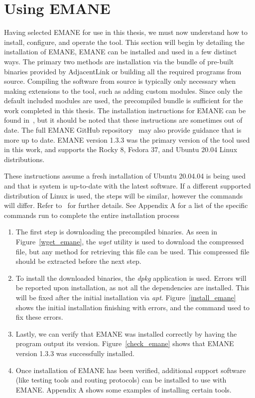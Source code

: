 \section{Using EMANE}
Having selected EMANE for use in this thesis, we must now understand how to install, configure, and operate the tool.
This section will begin by detailing the installation of EMANE, 
EMANE can be installed and used in a few distinct ways.
The primary two methods are installation via the bundle of pre-built binaries provided by AdjacentLink or building all the required programs from source.
Compiling the software from source is typically only necessary when making extensions to the tool, such as adding custom modules.
Since only the default included modules are used, the precompiled bundle is sufficient for the work completed in this thesis.
The installation instructions for EMANE can be found in~\cite{emane_tutorial}, but it should be noted that these instructions are sometimes out of date.
The full EMANE GitHub repository~\cite{emane_git} may also provide guidance that is more up to date.
EMANE version 1.3.3 was the primary version of the tool used in this work, and supports the Rocky 8, Fedora 37, and Ubuntu 20.04 Linux distributions.\par
These instructions assume a fresh installation of Ubuntu 20.04.04 is being used and that is system is up-to-date with the latest software.
If a different supported distribution of Linux is used, the steps will be similar, however the commands will differ. Refer to~\cite{emane_tutorial,emane_git} for further details.
See Appendix A for a list of the specific commands run to complete the entire installation process %
\begin{enumerate}
    \item The first step is downloading the precompiled binaries. As seen in Figure~\ref{wget_emane}, the \textit{wget} utility is used to download the compressed file, but any method for retrieving this file can be used. This compressed file should be extracted before the next step.
    \item To install the downloaded binaries, the \textit{dpkg} application is used. Errors will be reported upon installation, as not all the dependencies are installed. This will be fixed after the initial installation via \textit{apt}. Figure~\ref{install_emane} shows the initial installation finishing with errors, and the command used to fix these errors.
    \item Lastly, we can verify that EMANE was installed correctly by having the program output its version. Figure~\ref{check_emane} shows that EMANE version 1.3.3 was successfully installed.
    \item Once installation of EMANE has been verified, additional support software (like testing tools and routing protocols) can be installed to use with EMANE. Appendix A shows some examples of installing certain tools. %
\end{enumerate}


